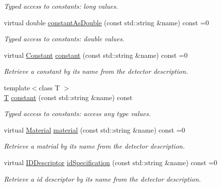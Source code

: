 \begin{DoxyCompactItemize}
\begin{DoxyCompactList}\small\item\em Typed access to constants\+: long values. \end{DoxyCompactList}\item 
virtual double \hyperlink{class_d_d4hep_1_1_geometry_1_1_l_c_d_d_a9696a0bb5af8abd3667460a617d4dc83}{constant\+As\+Double} (const std\+::string \&name) const =0
\begin{DoxyCompactList}\small\item\em Typed access to constants\+: double values. \end{DoxyCompactList}\item 
virtual \hyperlink{class_d_d4hep_1_1_geometry_1_1_constant}{Constant} \hyperlink{class_d_d4hep_1_1_geometry_1_1_l_c_d_d_a7c7e23e0ff875bf83493430bfaeb77c4}{constant} (const std\+::string \&name) const =0
\begin{DoxyCompactList}\small\item\em Retrieve a constant by it\textquotesingle{}s name from the detector description. \end{DoxyCompactList}\item 
{\footnotesize template$<$class T $>$ }\\\hyperlink{class_t}{T} \hyperlink{class_d_d4hep_1_1_geometry_1_1_l_c_d_d_ad4add3dc5cc881ea48ee69c0562a14e1}{constant} (const std\+::string \&name) const
\begin{DoxyCompactList}\small\item\em Typed access to constants\+: access any type values. \end{DoxyCompactList}\item 
virtual \hyperlink{class_d_d4hep_1_1_geometry_1_1_material}{Material} \hyperlink{class_d_d4hep_1_1_geometry_1_1_l_c_d_d_aec8adc99bc62ade78afd0a444a76fd04}{material} (const std\+::string \&name) const =0
\begin{DoxyCompactList}\small\item\em Retrieve a matrial by it\textquotesingle{}s name from the detector description. \end{DoxyCompactList}\item 
virtual \hyperlink{class_d_d4hep_1_1_geometry_1_1_i_d_descriptor}{I\+D\+Descriptor} \hyperlink{class_d_d4hep_1_1_geometry_1_1_l_c_d_d_ac08b5db047061a7b08d8b78bd7cb5e72}{id\+Specification} (const std\+::string \&name) const =0
\begin{DoxyCompactList}\small\item\em Retrieve a id descriptor by it\textquotesingle{}s name from the detector description. \end{DoxyCompactList}\item 

\end{DoxyCompactItemize}
